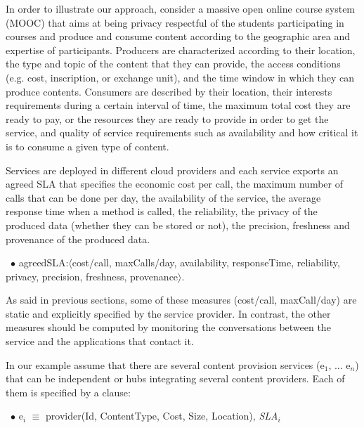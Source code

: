 In order to illustrate our approach, consider a massive open online course system (MOOC) that aims at being privacy respectful of the students participating in courses and produce and consume content according to the geographic area and expertise of participants. 
Producers are characterized according to their location, the type and topic of the content that they can provide, the access conditions (e.g. cost, inscription, or exchange unit), and the time window in which they can produce contents. 
Consumers are described by their location, their interests requirements during a certain interval of time, the maximum total cost they are ready to pay, or the resources they are ready to provide in order to get the service, and quality of service requirements such as availability and how critical it is to consume a given type of content. 

Services are deployed in different cloud providers and each service exports an agreed SLA that specifies the economic cost per call, the maximum number of calls that can be done per day, the availability of the service, the average response time when a method is called, the reliability, the privacy of the produced data (whether they can be stored or not), the precision, freshness and provenance of the produced data. 

\begin{trivlist}\sf\footnotesize
\item[~$\bullet$ ] {\sf agreedSLA:$\langle$cost/call, maxCalls/day, availability, responseTime, reliability, privacy, precision, freshness, provenance$\rangle$}. 
 \end{trivlist}
 
As said in previous sections, some of these measures ({\sf cost/call, maxCall/day}) are static and explicitly specified by the service provider. 
In contrast, the other measures should be computed by monitoring the conversations between the service and the applications that contact it.  

In our example assume that there are several content provision services ({\sf e$_1$, ... e$_n$}) that can be independent or hubs integrating several content providers. 
Each of them is specified by a clause:
\begin{trivlist}\sf\footnotesize
\item[~$\bullet$ ]   e$_i$ $\equiv$ provider(Id, ContentType, Cost, Size, Location), \textit{SLA}$_i$
\end{trivlist}

